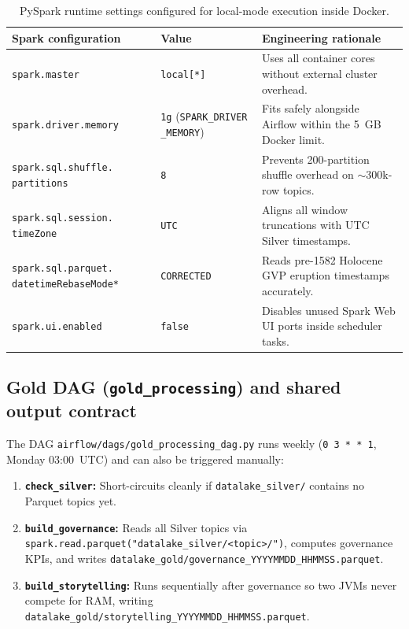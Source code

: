 \documentclass[11pt,a4paper]{article}
\begin{document}
\begin{table}[htbp]
\centering
\caption{PySpark runtime settings configured for local-mode execution inside Docker.}\label{tab:spark_conf}
\begin{tabular}{L{4.8cm}L{3.2cm}L{6.5cm}}
\toprule
\textbf{Spark configuration} & \textbf{Value} & \textbf{Engineering rationale}\\
\midrule
\texttt{spark.master} & \texttt{local[*]} & Uses all container cores without external cluster overhead.\\
\texttt{spark.driver.memory} & \texttt{1g} (\texttt{SPARK\_DRIVER \_MEMORY}) & Fits safely alongside Airflow within the 5~GB Docker limit.\\
\texttt{spark.sql.shuffle. partitions} & \texttt{8} & Prevents 200-partition shuffle overhead on $\sim$300k-row topics.\\
\texttt{spark.sql.session. timeZone} & \texttt{UTC} & Aligns all window truncations with UTC Silver timestamps.\\
\texttt{spark.sql.parquet. datetimeRebaseMode*} & \texttt{CORRECTED} & Reads pre-1582 Holocene GVP eruption timestamps accurately.\\
\texttt{spark.ui.enabled} & \texttt{false} & Disables unused Spark Web UI ports inside scheduler tasks.\\
\bottomrule
\end{tabular}
\end{table}

\subsection{Gold DAG (\texttt{gold\_processing}) and shared output contract}
The DAG \texttt{airflow/dags/gold\_processing\_dag.py} runs weekly (\texttt{0 3 * * 1}, Monday 03:00~UTC) and can also be triggered manually:
\begin{enumerate}
  \item \textbf{\texttt{check\_silver}:} Short-circuits cleanly if \texttt{datalake\_silver/} contains no Parquet topics yet.
  \item \textbf{\texttt{build\_governance}:} Reads all Silver topics via \texttt{spark.read.parquet("datalake\_silver/<topic>/")}, computes governance KPIs, and writes \texttt{datalake\_gold/governance\_YYYYMMDD\_HHMMSS.parquet}.
  \item \textbf{\texttt{build\_storytelling}:} Runs sequentially after governance so two JVMs never compete for RAM, writing \texttt{datalake\_gold/storytelling\_YYYYMMDD\_HHMMSS.parquet}.
\end{enumerate}
\end{document}
